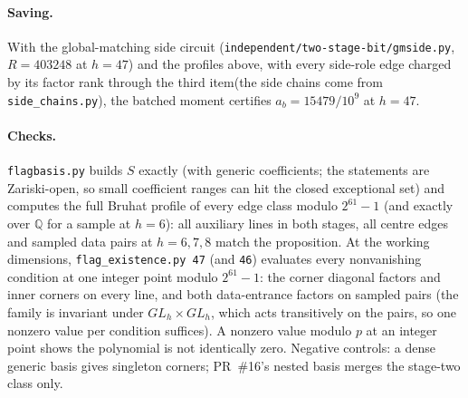 \documentclass[11pt]{article}
\theoremstyle{remark}\newtheorem*{remark}{Remark}
\begin{document}
\paragraph{Saving.} With the global-matching side circuit (\texttt{independent/two-stage-bit/gmside.py}, $R=403248$
at $h=47$) and the profiles above, with every side-role edge charged by its factor rank through the third item\n(the side chains come from \texttt{side\_chains.py}), the batched moment certifies $a_b=15479/10^9$ at $h=47$.

\paragraph{Checks.} \texttt{flagbasis.py} builds $S$ exactly (with generic coefficients; the statements are
Zariski-open, so small coefficient ranges can hit the closed exceptional set) and computes the full Bruhat profile of every edge class
modulo $2^{61}-1$ (and exactly over $\mathbb Q$ for a sample at $h=6$): all auxiliary lines in both stages, all centre
edges and sampled data pairs at $h=6,7,8$ match the proposition. At the working dimensions, \texttt{flag\_existence.py 47} (and \texttt{46}) evaluates every
nonvanishing condition at one integer point modulo $2^{61}-1$: the corner diagonal factors and inner corners on every
line, and both data-entrance factors on sampled pairs (the family is invariant under $GL_h\times GL_h$, which acts
transitively on the pairs, so one nonzero value per condition suffices). A nonzero value modulo $p$ at an integer
point shows the polynomial is not identically zero. Negative controls: a dense generic basis gives
singleton corners; PR~\#16's nested basis merges the stage-two class only.
\end{document}

